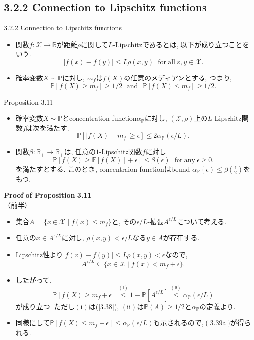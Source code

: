 \documentclass[aspectratio=169, dvipdfmx]{beamer}
\newcommand{\ex}{\mathbb{E}}
\begin{document}
\subsection{3.2.2 Connection to Lipschitz functions}
\begin{frame}{3.2.2 Connection to Lipschitz functions}
\begin{itemize}
    \item 関数$f:\mathcal{X}\to\mathbb{R}$が距離$\rho$に関して$L$-Lipschitzであるとは, 以下が成り立つことをいう.
    \[ |f(x)-f(y)| \le L \rho(x, y) \ \ \ \mathrm{for\ all}\ x,y\in\mathcal{X}. \tag{3.36}\label{3.36}\]
    \item 確率変数$X \sim \mathbb{P}$に対し, $m_f$は$f(X)$の任意のメディアンとする, つまり,
    \[ \mathbb{P}[f(X) \ge m_f] \ge 1/2\ \ \ \mathrm{and}\ \ \ \mathbb{P}[f(X) \le m_f] \ge 1/2. \tag{3.37}\label{3.37}\]
\end{itemize}
\begin{block}{Proposition 3.11}
\begin{itemize}
    \item 確率変数$X\sim \mathbb{P}$とconcentration function$\alpha_{\mathbb{P}}$に対し,
    $(\mathcal{X}, \rho)$上の$L$-Lipschitz関数$f$は次を満たす.
    \[ \mathbb{P}[|f(X)-m_f|\ge \epsilon] \le 2 \alpha_{\mathbb{P}}(\epsilon/L). \tag{3.39a}\label{3.39a}\]
    \item 関数$\beta:\mathbb{R}_+\to\mathbb{R}_+$は, 任意の$1$-Lipschitz関数$f$に対し
    \[ \mathbb{P}[f(X) \ge \ex[f(X)] + \epsilon] \le \beta(\epsilon)\ \ \ \mathrm{for\ any}\ \epsilon \ge 0. \tag{3.39b}\label{3.39b}\]
    を満たすとする. このとき, concentraion functionはbound $\alpha_{\mathbb{P}}(\epsilon) \le \beta(\frac{\epsilon}{2})$をもつ.
\end{itemize}
\end{block}
\end{frame}

\begin{frame}{}{}
{\bf Proof of Proposition 3.11}\\
{（前半）}
\begin{itemize}
    \item 集合$A = \{x\in\mathcal{X} \mid f(x) \le m_f\}$と, その$\epsilon/L$-拡張$A^{\epsilon/L}$について考える.
    \item 任意の$x \in A^{\epsilon/L}$に対し, $\rho(x, y) < \epsilon/L$なる$y\in A$が存在する.
    \item Lipschitz性より$|f(x) - f(y)| \le L\rho(x,y) < \epsilon$なので,
    \[ A^{\epsilon/L} \subseteq \{x\in\mathcal{X} \mid f(x) < m_f + \epsilon\}. \tag{3.38}\label{3.38} \]
    \item したがって,
    \[ 
        \mathbb{P}[f(X)\ge m_f+\epsilon]
        \stackrel{\mathrm{(i)}}{\le} 1-\mathbb{P}[A^{\epsilon/L}]
        \stackrel{\mathrm{(ii)}}{\le} \alpha_{\mathbb{P}}(\epsilon/L)
    \]
     が成り立つ, ただし$\mathrm{(i)}$は(\ref{3.38}), $\mathrm{(ii)}$は$\mathbb{P}(A) \ge 1/2$と$\alpha_{\mathbb{P}}$の定義より.
    \item 同様にして$\mathbb{P}[f(X)\le m_f-\epsilon] \le \alpha_{\mathbb{P}}(\epsilon/L)$も示されるので, (\ref{3.39a})が得られる.
\end{itemize}
\end{frame}
\end{document}
